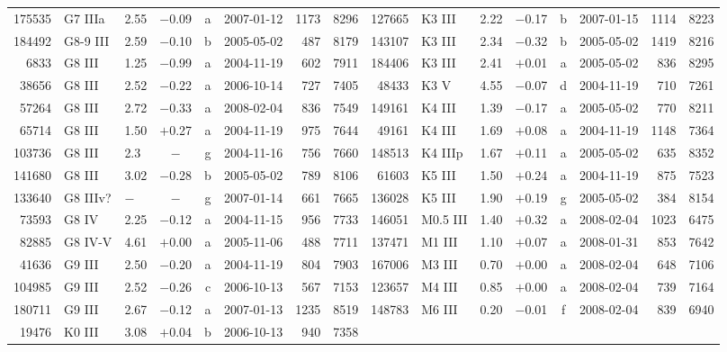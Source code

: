 \begin{table}
{\begin{tabular}{|r l l c c c r c || r l l c c c r c|}
175535 & G7 IIIa  & 2.55 & $-$0.09 & a & 2007-01-12 & 1173 & 8296 & 127665 & K3 III   & 2.22 & $-$0.17 & b & 2007-01-15 & 1114 & 8223 \\
184492 & G8-9 III & 2.59 & $-$0.10 & b & 2005-05-02 &  487 & 8179 & 143107 & K3 III   & 2.34 & $-$0.32 & b & 2005-05-02 & 1419 & 8216 \\
  6833 & G8 III   & 1.25 & $-$0.99 & a & 2004-11-19 &  602 & 7911 & 184406 & K3 III   & 2.41 & $+$0.01 & a & 2005-05-02 &  836 & 8295 \\
 38656 & G8 III   & 2.52 & $-$0.22 & a & 2006-10-14 &  727 & 7405 &  48433 & K3 V     & 4.55 & $-$0.07 & d & 2004-11-19 &  710 & 7261 \\ 
 57264 & G8 III   & 2.72 & $-$0.33 & a & 2008-02-04 &  836 & 7549 & 149161 & K4 III   & 1.39 & $-$0.17 & a & 2005-05-02 &  770 & 8211 \\
 65714 & G8 III   & 1.50 & $+$0.27 & a & 2004-11-19 &  975 & 7644 &  49161 & K4 III   & 1.69 & $+$0.08 & a & 2004-11-19 & 1148 & 7364 \\
103736 & G8 III   & 2.3  & $-$     & g & 2004-11-16 &  756 & 7660 & 148513 & K4 IIIp  & 1.67 & $+$0.11 & a & 2005-05-02 &  635 & 8352 \\
141680 & G8 III   & 3.02 & $-$0.28 & b & 2005-05-02 &  789 & 8106 &  61603 & K5 III   & 1.50 & $+$0.24 & a & 2004-11-19 &  875 & 7523 \\
133640 & G8 IIIv? & $-$  & $-$     & g & 2007-01-14 &  661 & 7665 & 136028 & K5 III   & 1.90 & $+$0.19 & g & 2005-05-02 &  384 & 8154 \\
 73593 & G8 IV    & 2.25 & $-$0.12 & a & 2004-11-15 &  956 & 7733 & 146051 & M0.5 III & 1.40 & $+$0.32 & a & 2008-02-04 & 1023 & 6475 \\
 82885 & G8 IV-V  & 4.61 & $+$0.00 & a & 2005-11-06 &  488 & 7711 & 137471 & M1 III   & 1.10 & $+$0.07 & a & 2008-01-31 &  853 & 7642 \\
 41636 & G9 III   & 2.50 & $-$0.20 & a & 2004-11-19 &  804 & 7903 & 167006 & M3 III   & 0.70 & $+$0.00 & a & 2008-02-04 &  648 & 7106 \\
104985 & G9 III   & 2.52 & $-$0.26 & c & 2006-10-13 &  567 & 7153 & 123657 & M4 III   & 0.85 & $+$0.00 & a & 2008-02-04 &  739 & 7164 \\
180711 & G9 III   & 2.67 & $-$0.12 & a & 2007-01-13 & 1235 & 8519 & 148783 & M6 III   & 0.20 & $-$0.01 & f & 2008-02-04 &  839 & 6940 \\
 19476 & K0 III   & 3.08 & $+$0.04 & b & 2006-10-13 &  940 & 7358 &        &          &      &       &   &            &      &      \\

\end{tabular}}
\end{table}
